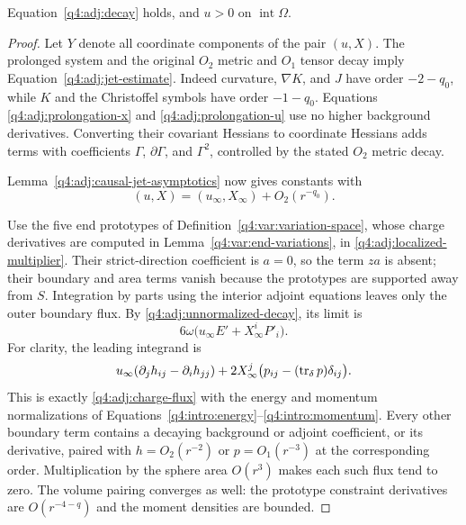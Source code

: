 \begin{lemma}
\label{q4:adj:asymptotics}
Equation~\eqref{q4:adj:decay} holds, and $u>0$ on
$\operatorname{int}\Omega$.
\end{lemma}

\begin{proof}
Let $Y$ denote all coordinate components of the pair $(u,X)$.  The prolonged
system and the original $O_2$ metric and $O_1$ tensor decay imply
Equation~\eqref{q4:adj:jet-estimate}.
Indeed curvature, $\nabla K$, and $J$ have order $-2-q_0$, while $K$ and
the Christoffel symbols have order $-1-q_0$.  Equations
\eqref{q4:adj:prolongation-x} and \eqref{q4:adj:prolongation-u} use no higher
background derivatives.  Converting their covariant Hessians to coordinate
Hessians adds terms with coefficients $\Gamma$, $\partial\Gamma$, and
$\Gamma^2$, controlled by the stated $O_2$ metric decay.

Lemma~\ref{q4:adj:causal-jet-asymptotics} now gives constants with
\begin{equation}
 (u,X)=(u_\infty,X_\infty)+O_2(r^{-q_0}).
 \label{q4:adj:unnormalized-decay}
\end{equation}

Use the five end prototypes of Definition~\ref{q4:var:variation-space},
whose charge derivatives are computed in Lemma~\ref{q4:var:end-variations}, in
\eqref{q4:adj:localized-multiplier}.  Their strict-direction coefficient is
$a=0$, so the term $za$ is absent; their boundary and area terms vanish
because the prototypes are supported away from $S$.  Integration by parts
using the interior adjoint equations leaves only the outer boundary flux.
By \eqref{q4:adj:unnormalized-decay}, its limit is
\begin{equation}
 6\omega\bigl(u_\infty E'+X_\infty^iP'_i\bigr).
 \label{q4:adj:charge-flux}
\end{equation}
For clarity, the leading integrand is
\[
 u_\infty(\partial_jh_{ij}-\partial_i h_{jj})
 +2X_\infty^j\bigl(p_{ij}-(\operatorname{tr}_\delta p)\delta_{ij}\bigr).
\]
This is exactly \eqref{q4:adj:charge-flux} with the energy and momentum
normalizations of Equations~\eqref{q4:intro:energy}--\eqref{q4:intro:momentum}.  Every other boundary term
contains a decaying background or adjoint coefficient, or its derivative,
paired with $h=O_2(r^{-2})$ or $p=O_1(r^{-3})$ at the corresponding order.
Multiplication by the sphere area $O(r^3)$ makes each such flux tend to zero.
The volume pairing converges as well: the prototype constraint derivatives
are $O(r^{-4-q})$ and the moment densities are bounded.


\end{proof}
